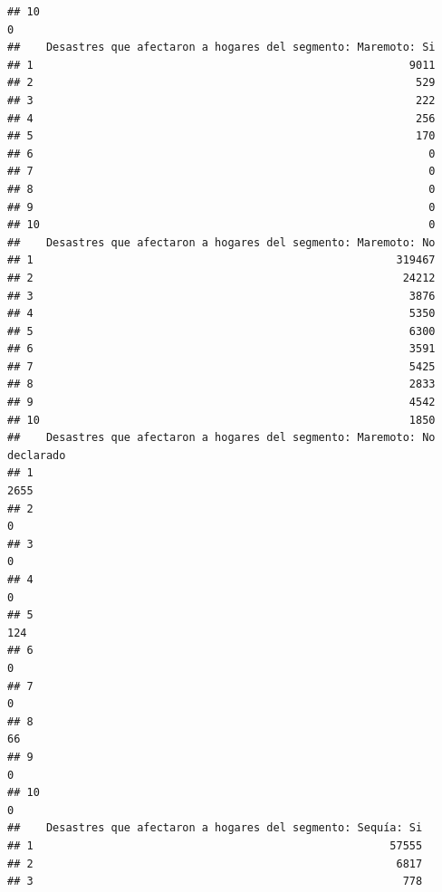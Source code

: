 \documentclass[11pt,]{article}
\begin{document}
\begin{verbatim}
## 10                                                                            0
##    Desastres que afectaron a hogares del segmento: Maremoto: Si
## 1                                                          9011
## 2                                                           529
## 3                                                           222
## 4                                                           256
## 5                                                           170
## 6                                                             0
## 7                                                             0
## 8                                                             0
## 9                                                             0
## 10                                                            0
##    Desastres que afectaron a hogares del segmento: Maremoto: No
## 1                                                        319467
## 2                                                         24212
## 3                                                          3876
## 4                                                          5350
## 5                                                          6300
## 6                                                          3591
## 7                                                          5425
## 8                                                          2833
## 9                                                          4542
## 10                                                         1850
##    Desastres que afectaron a hogares del segmento: Maremoto: No declarado
## 1                                                                    2655
## 2                                                                       0
## 3                                                                       0
## 4                                                                       0
## 5                                                                     124
## 6                                                                       0
## 7                                                                       0
## 8                                                                      66
## 9                                                                       0
## 10                                                                      0
##    Desastres que afectaron a hogares del segmento: Sequía: Si
## 1                                                       57555
## 2                                                        6817
## 3                                                         778

\end{verbatim}
\end{document}
